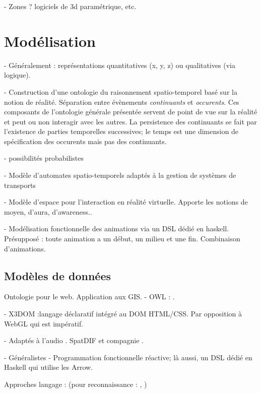 \documentclass[french,12pt]{article}
\begin{document}
 - Zones ? logiciels de 3d paramétrique, etc. %

\section{Modélisation}
- Généralement : représentations quantitatives (x, y, z) ou qualitatives (via logique).
\cite{porter_handbook_2008}

- Construction d'une ontologie du raisonnement spatio-temporel basé sur la notion de réalité. Séparation entre évènements \textit{continuants} et \textit{occurents}. Ces composants de l'ontologie générale présentée servent de point de vue sur la réalité et peut ou non interagir avec les autres. La persistence des continuants se fait par l'existence de parties temporelles successives; le temps est une dimension de spécification des occurents mais pas des continuants.
\cite{grenon_formal_2003}

- possibilités probabilistes

- Modèle d'automates spatio-temporels adaptés à la gestion de systèmes de transports %
\cite{zhang_timed_2014}

- Modèle d'espace pour l'interaction en réalité virtuelle. Apporte les notions de moyen, d'aura, d'awareness..
\cite{benford_spatial_1993}

- Modélisation fonctionnelle des animations via un DSL dédié en haskell. Présupposé : toute animation a un début, un milieu et une fin. Combinaison d'animations.
\cite{matlage_every_2011}

\subsection{Modèles de données}
Ontologie pour le web. Application aux \ac{GIS}.
- OWL : \cite{mefteh_approche_2013}.

- X3DOM :langage déclaratif intégré au DOM HTML/CSS\cite{jankowski_declarative_2013}. Par opposition à WebGL qui est impératif.

- Adaptés à l'audio
. SpatDIF et compagnie \cite{peters_spatial_2013}\cite{kendall_towards_2008}
. \cite{kondoz_object-based_2014}

- Généralistes
- Programmation fonctionnelle réactive; là aussi, un DSL dédié en Haskell qui utilise les Arrow.
\cite{hudak_arrows_2003}

Approches langage : (pour reconnaissance : \cite{spranger_recruitment_2011}\cite{spranger_emergent_2012}, )
\end{document}
